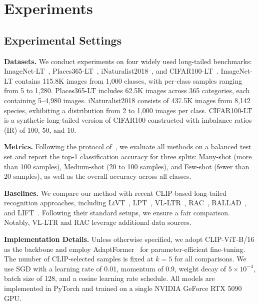 \section{Experiments}
\label{experiments} 

\subsection{Experimental Settings}
\noindent \textbf{Datasets.} 
We conduct experiments on four widely used long-tailed benchmarks: ImageNet-LT~\cite{liu2019large}, Places365-LT~\cite{liu2019large}, iNaturalist2018~\cite{van2018inaturalist}, and CIFAR100-LT~\cite{cao2019learning}.
ImageNet-LT contains 115.8K images from 1,000 classes, with per-class samples ranging from 5 to 1,280. Places365-LT includes 62.5K images across 365 categories, each containing 5–4,980 images. iNaturalist2018 consists of 437.5K images from 8,142 species, exhibiting a distribution from 2 to 1,000 images per class. CIFAR100-LT is a synthetic long-tailed version of CIFAR100 constructed with imbalance ratios (IR) of 100, 50, and 10.


\noindent \textbf{Metrics.}
Following the protocol of~\cite{liu2019large}, we evaluate all methods on a balanced test set and report the top-1 classification accuracy for three splits: Many-shot (more than 100 samples), Medium-shot (20 to 100 samples), and Few-shot (fewer than 20 samples), as well as the overall accuracy across all classes.


\noindent \textbf{Baselines.}
We compare our method with recent CLIP-based long-tailed recognition approaches, including LiVT~\cite{xu2023learning}, LPT~\cite{dong2023lpt}, VL-LTR~\cite{tian2022vl}, RAC~\cite{long2022retrieval}, BALLAD~\cite{ma2021simple}, and LIFT~\cite{shi2024long}. Following their standard setups, we ensure a fair comparison. Notably, VL-LTR and RAC leverage additional  data sources.


\noindent \textbf{Implementation Details.}
Unless otherwise specified, we adopt CLIP-ViT-B/16 as the backbone and employ AdaptFormer~\cite{chen2022adaptformer} for parameter-efficient fine-tuning. The number of CLIP-selected samples is fixed at $k=5$ for all comparisons.
We use SGD with a learning rate of 0.01, momentum of 0.9, weight decay of $5\times10^{-4}$, batch size of 128, and a cosine learning rate schedule. All models are implemented in PyTorch and trained on a single NVIDIA GeForce RTX 5090 GPU.

